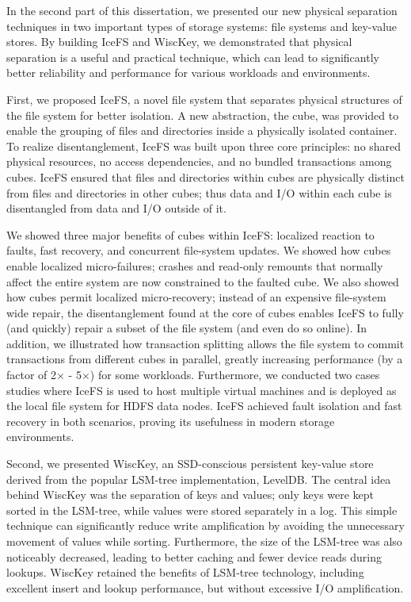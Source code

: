 In the second part of this dissertation, we presented our new
physical separation techniques in two important types of storage
systems: file systems and key-value stores. By building IceFS and
WiscKey, we demonstrated that physical separation is a useful and
practical technique, which can lead to significantly better
reliability and performance for various workloads and environments. 

First, we proposed IceFS, a novel file system that separates physical
structures of the file system for better isolation.  A new
abstraction, the cube, was provided to enable the grouping of files
and directories inside a physically isolated container. 
To realize disentanglement, IceFS was built upon three core principles:
no shared physical resources, no access dependencies, and no bundled
transactions among cubes. IceFS ensured that files and
directories within cubes are physically distinct from files and
directories in other cubes; thus data and I/O within each cube is
disentangled from data and I/O outside of it. 

We showed three major benefits of cubes within IceFS: localized
reaction to faults, fast recovery, and concurrent file-system updates. 
We showed how cubes enable localized micro-failures; crashes and
read-only remounts that normally affect the entire system are now
constrained to the faulted cube. We also showed how cubes permit
localized micro-recovery; instead of an expensive file-system wide
repair, the disentanglement found at the core of cubes enables 
IceFS to fully (and quickly) repair a subset of the file system (and even
do so online). In addition, we illustrated how transaction splitting
allows the file system to commit transactions from different cubes in
parallel, greatly increasing performance (by a factor of 2$\times$ - 5$\times$) for 
some workloads.  Furthermore, we conducted two cases studies where
IceFS is used to host multiple virtual machines and is deployed as the
local file system for HDFS data nodes. IceFS achieved fault isolation
and fast recovery in both scenarios, proving its usefulness in modern
storage environments.

Second, we presented WiscKey, an SSD-conscious persistent key-value
store derived from the popular LSM-tree implementation, LevelDB. The
central idea behind WiscKey was the separation of keys and values;
only keys were kept sorted in the LSM-tree, while values were stored
separately in a log. This simple technique can significantly reduce
write amplification by avoiding the unnecessary movement of values
while sorting. Furthermore, the size of the LSM-tree was also
noticeably decreased, leading to better caching and fewer device reads
during lookups. WiscKey retained the benefits of LSM-tree technology,
including excellent insert and lookup performance, but without
excessive I/O amplification. 

